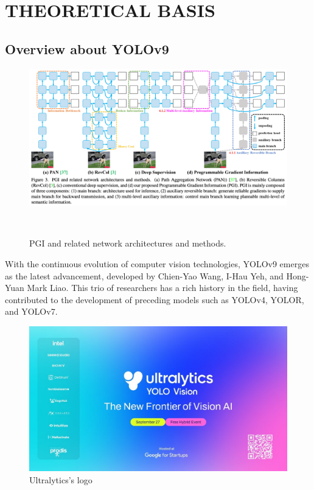\chapter{THEORETICAL BASIS}

\renewcommand{\headrulewidth}{0.5pt}
\renewcommand{\footrulewidth}{0.5pt}
\thispagestyle{plain}
\pagestyle{fancy}
\fancyhf{}
\raggedright
{}

\justifying

\section{Overview about YOLOv9}
    \begin{figure}[H]
        \centering
        \includegraphics[width=0.8\linewidth]{img/core_innovation.png}
        \caption{PGI and related network architectures and methods. }\
        \label{fig:PGI}
    \end{figure}
    With the continuous evolution of computer vision technologies, YOLOv9 emerges as the latest advancement, developed by Chien-Yao
    Wang, I-Hau Yeh, and Hong-Yuan Mark Liao. This trio of researchers has a rich history in the field, having contributed to the
    development of preceding models such as YOLOv4, YOLOR, and YOLOv7. \\
    \begin{figure}[H]
        \centering
        \includegraphics[width=0.8\linewidth]{img/ultralytics.jpg}
        \caption{Ultralytics's logo}
    \end{figure}
